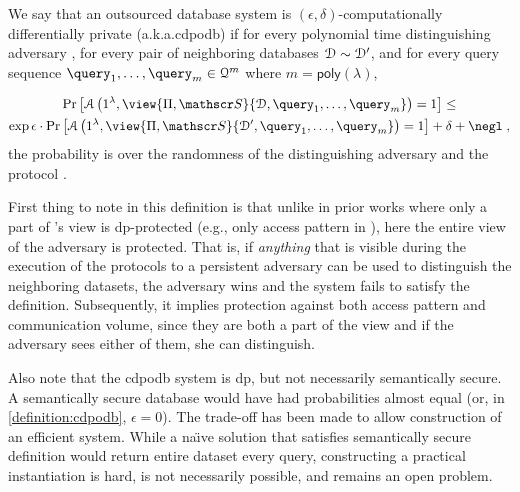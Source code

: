 			\begin{definition}\label{definition:cdpodb}
				We say that an outsourced database system \protocol{} is $(\epsilon, \delta)$-computationally differentially private (a.k.a.\acrshort{cdpodb}) if for every polynomial time distinguishing adversary \adversary{}, for every pair of neighboring databases $\mathcal{D} \sim \mathcal{D}^\prime$, and for every query sequence $\fromNtoM{\query}{1}{m} \in \querySet^m$ where $m = \mathsf{poly}(\lambda)$,

				\begin{multline*}
					\probability{\adversary \left( 1^\lambda, \view{\protocol, \server}{\database, \fromNtoM{\query}{1}{m}} \right) = 1 } \leq \\
					\exp{\epsilon} \cdot \probability{\adversary \left( 1^\lambda, \view{\protocol ,\server}{\database^\prime, \fromNtoM{\query}{1}{m}} \right) = 1} + \delta + \negl \; ,
				\end{multline*}
				the probability is over the randomness of the distinguishing adversary \adversary{} and the protocol \protocol{}.
			\end{definition}

			First thing to note in this definition is that unlike in prior works where only a part of \adversary{}'s view is \acrshort{dp}-protected (e.g., only access pattern in \cite{differential-obliviousness,differential-obliviousness-followup}), here the entire view of the adversary is protected.
			That is, if \emph{anything} that is visible during the execution of the protocols to a persistent adversary can be used to distinguish the neighboring datasets, the adversary wins and the system fails to satisfy the definition.
			Subsequently, it implies protection against both access pattern and communication volume, since they are both a part of the view and if the adversary sees either of them, she can distinguish.

			Also note that the \acrshort{cdpodb} system is \acrshort{dp}, but not necessarily semantically secure.
			A semantically secure database would have had probabilities almost equal (or, in \cref{definition:cdpodb}, $\epsilon = 0$).
			The trade-off has been made to allow construction of an efficient system.
			While a na\"{\i}ve solution that satisfies semantically secure definition would return entire dataset every query, constructing a practical instantiation is hard, is not necessarily possible, and remains an open problem.

